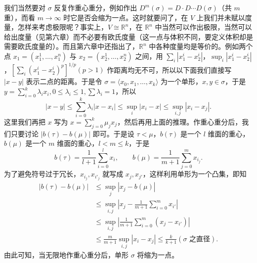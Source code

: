 我们当然要对 $\sigma$ 反复作重心重分，例如作出 $D^m(\sigma)=D\cdot D\cdots D(\sigma)$（共 $m$ 重），而看 $m\to\infty$ 时它是否会缩为一点。这时就要问了，在 $V$ 上我们并未赋以度量，怎样来考虑极限呢？事实上，$V\cong\mathbb R^n$，在 $\mathbb R^n$ 中当然可以作出极限，当然可以给出度量（见第六章）而不必要有欧氏度量（这一点与体积不同，要定义体积却是需要欧氏度量的）。而且第六章中还指出了，$\mathbb R^n$ 中各种度量均是等价的。例如两个点 $x_1=(x_1^1,\ldots,x_1^n)$ 与 $x_2=(x_2^1,\ldots,x_2^n)$ 之间，用 $\sum_i|x_1^i-x_2^i|$，$\sup_i|x_1^i-x_2^i|$，$[\sum_i(x_1^i-x_2^i)^p]^{1/p}(p>1)$ 作距离均无不可，所以以下面我们直接写 $|x-y|$ 表示二点的距离。于是令 $\sigma=\langle x_0,x_1,\ldots,x_k\rangle$ 为一个单形，$x,y\in\sigma$，于是 $y=\sum_{i=0}^k\lambda_i x_i,0\le\lambda_i\le1,\sum\lambda_i=1$，所以
\[
 |x-y|\le\sum_{i=0}^k\lambda_i|x-x_i|
 \le\sup_i|x_i-x|\le\sup_{i,j}|x_i-x_j|.
\]
这里我们再把 $x$ 写为 $x=\sum_{j=0}^k\mu_jx_j$，然后再用上面的推理。作重心重分后，我们只要讨论 $|b(\tau)-b(\mu)|$ 即可。于是设 $\tau<\mu$，$b(\tau)$ 是一个 $l$ 维面的重心，$b(\mu)$ 是一个 $m$ 维面的重心，$l<m\le k$，于是
\[
 b(\tau)=\frac1{l+1}\sum_{i=0}^l x_i,
 \qquad
 b(\mu)=\frac1{m+1}\sum_{j=0}^m x_{i_j}.
\]
为了避免符号过于冗长，$x_{i_j},x_{i'_j}$ 就写成 $x_j,x_{j'}$，这样利用单形为一个凸集，即知
\begin{align*}
 |b(\tau)-b(\mu)|
 &\le \sup_j|x_j-b(\mu)|\\
 &\le \sup_{i,j}\left|x_j-\frac1{m+1}\sum_{i=0}^m x_{i'}\right|\\
 &\le \sup_{i,j}\left|\frac1{m+1}\sum_{i=0}^m(x_j-x_{i'})\right|\\
 &\le \frac{m}{m+1}\sup_{i,j}|x_i-x_j|
 \le \frac{k}{k+1}(\sigma\text{ 之直径}).
\end{align*}
由此可知，当无限地作重心重分后，单形 $\sigma$ 将缩为一点。

